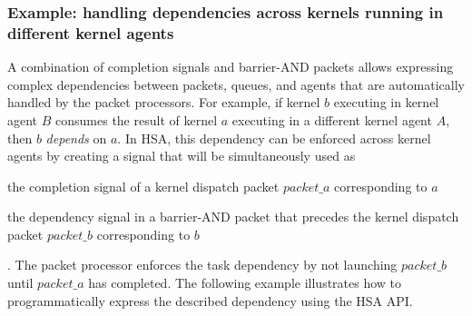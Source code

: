 \documentclass[final,oneside]{book}
\begin{document}
\subsubsection{Example: handling dependencies across kernels running in
  different kernel agents}
A combination of completion signals and barrier-AND packets allows expressing
complex dependencies between packets, queues, and agents that are
automatically handled by the packet processors. For example, if kernel $b$
executing in kernel agent $B$ consumes the result of kernel $a$ executing in a
different kernel agent $A$, then $b$ \textit{depends} on $a$. In HSA, this
dependency can be enforced across kernel agents by creating a signal that will
be simultaneously used as \begin{inparaenum}[1\upshape)] \item the completion
  signal of a kernel dispatch packet $packet\_a$ corresponding to $a$ \item the
  dependency signal in a barrier-AND packet that precedes the kernel dispatch
  packet $packet\_b$ corresponding to $b$\end{inparaenum}. The packet processor
enforces the task dependency by not launching $packet\_b$ until $packet\_a$ has
completed. The following example illustrates how to programmatically express the
described dependency using the HSA API.
\end{document}
